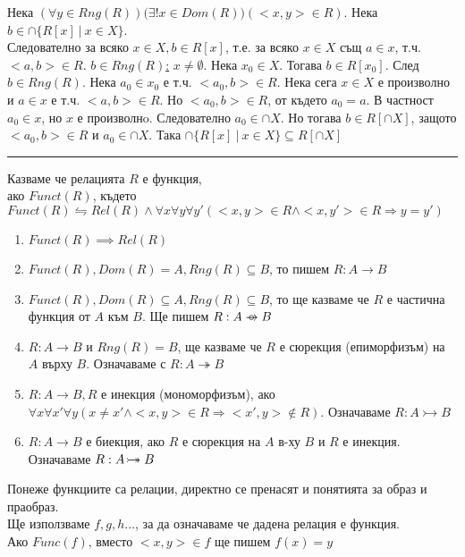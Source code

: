 \documentclass[fleqn, titlepage, 12pt]{report}
\newcommand*\rightbijectionarrow{\mathrel{\ooalign{
  $\twoheadrightarrow$\cr\hidewidth\hbox{$\rightarrowtail\mkern 1mu$}\cr }}}
\newcommand*\rightcircarrow{\mathrel{\ooalign{$\rightarrow$\cr\hidewidth\hbox{$\circ\mkern 5mu$}\cr}}}
\begin{document}
\bigbreak
Нека $(\forall{y \in Rng(R)})(\exists{!x \in Dom(R))(<x,y> \in R)}$. Нека $b \in \cap \{R[x]\ |\ x \in X\}$.\\
Следователно за всяко $x \in X, b \in R[x]$, т.е. за всяко $x \in X$ същ $a \in x$,
т.ч. $<a,b> \in R$.
\bigbreak
\underline{$b \in Rng(R)$:} $x \neq \emptyset$. Нека $x_0 \in X$. Тогава $b \in R[x_0]$. След $b \in Rng(R)$.
Нека $a_0 \in x_0$ е т.ч. $<a_0,b> \in R$. Нека сега $x \in X$ е произволно и $a \in x$ е т.ч. $<a,b> \in R$.
Но $<a_0,b> \in R$, от където $a_0 = a$. В частност $a_0 \in x$, но $x$ е произволнo. Следователно $a_0 \in \cap X$.
Но тогава $b \in R[\cap X]$, защото $<a_0,b> \in R$ и $a_0 \in \cap X$.
Така $\cap \{R[x]\ |\ x \in X\} \subseteq R[\cap X]$
\bigbreak

\bigbreak
\hrule
\begin{center}
\end{center}

\bigbreak
{} Казваме че релацията $R$ е функция, \\
ако $Funct(R)$, където $Funct(R) \leftrightharpoons Rel(R) \land  \forall{x}\forall{y}\forall{y'}(<x,y> \in R \land  <x,y'> \in R \Rightarrow y = y')$
\bigbreak

\begin{enumerate}
  \item $Funct(R) \implies Rel(R)$
  \item $Funct(R), Dom(R) = A, Rng(R) \subseteq B$, то пишем $R: A \rightarrow B$
  \item $Funct(R), Dom(R) \subseteq A , Rng (R) \subseteq B$, то ще казваме че $R$ е частична функция от $A$ към $B$.
    Ще пишем $R: A \rightcircarrow B$
  \item $R: A \rightarrow B$ и $Rng(R) = B$, ще казваме че $R$ е сюрекция (епиморфизъм) на $A$ върху $B$.
    Означаваме с $R: A \twoheadrightarrow B$
  \item $R: A \rightarrow B, R$ е инекция (мономорфизъм),
    ако $\forall{x}\forall{x'}\forall{y}(x \neq x' \land <x,y> \in R \Rightarrow <x',y> \notin R)$.
    Означаваме $R: A \rightarrowtail B$
  \item $R: A \rightarrow B$ е биекция, ако $R$ е сюрекция на $A$ в-ху $B$ и $R$ е инекция.
    Означаваме $R: A \rightbijectionarrow B$
\end{enumerate}
\bigbreak

Понеже функциите са релации, директно се пренасят и понятията за образ и праобраз.\\
Ще използваме $f,g,h ...$, за да означаваме че дадена релация е функция.\\
Ако $Func(f)$, вместо $<x,y> \in f$ ще пишем $f(x) = y$
\bigbreak
\end{document}
